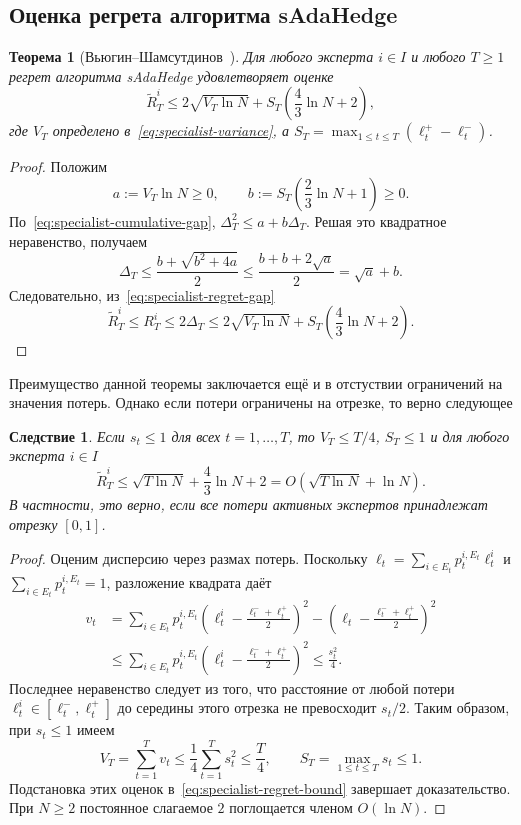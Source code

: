 \documentclass[a4paper,12pt]{article}
\theoremstyle{plain}
\newtheorem*{theorem}{Теорема}
\newtheorem*{corollary}{Следствие}
\theoremstyle{definition}
\theoremstyle{remark}
\numberwithin{equation}{section}
\begin{document}
\subsection{Оценка регрета алгоритма sAdaHedge}

\begin{theorem}[Вьюгин--Шамсутдинов~\cite{VyuginSham}]
Для любого эксперта $i\in I$ и любого $T\geqslant1$ регрет алгоритма sAdaHedge удовлетворяет оценке
\begin{equation}
\label{eq:specialist-regret-bound}
\widetilde R_T^i
\leqslant2\sqrt{V_T\ln N}
 +S_T\left(\frac43\ln N+2\right),
\end{equation}
где $V_T$ определено в~\eqref{eq:specialist-variance}, а $S_T=\max_{1\leqslant t\leqslant T}(\ell_t^+-\ell_t^-)$.
\end{theorem}

\begin{proof}
Положим
\[
a:=V_T\ln N\geqslant0,
\qquad
b:=S_T\left(\frac23\ln N+1\right)\geqslant0.
\]
По~\eqref{eq:specialist-cumulative-gap}, $\Delta_T^2\leqslant a+b\Delta_T$. Решая это квадратное неравенство, получаем
\[
\Delta_T
\leqslant\frac{b+\sqrt{b^2+4a}}2
\leqslant\frac{b+b+2\sqrt a}2
=\sqrt a+b.
\]
Следовательно, из~\eqref{eq:specialist-regret-gap}
\[
\widetilde R_T^i
\leqslant R_T^i
\leqslant2\Delta_T
\leqslant2\sqrt{V_T\ln N}
 +S_T\left(\frac43\ln N+2\right).
\]
\end{proof}

Преимущество данной теоремы заключается ещё и в отстуствии ограничений на значения потерь. Однако если потери ограничены на отрезке, то верно следующее

\begin{corollary}
Если $s_t\leqslant1$ для всех $t=1,\dots,T$, то $V_T\leqslant T/4$, $S_T\leqslant1$ и для любого эксперта $i\in I$
\[
\widetilde R_T^i
\leqslant\sqrt{T\ln N}+\frac43\ln N+2
=O\!\left(\sqrt{T\ln N}+\ln N\right).
\]
В частности, это верно, если все потери активных экспертов принадлежат отрезку $[0,1]$.
\end{corollary}

\begin{proof}
Оценим дисперсию через размах потерь. Поскольку $\ell_t=\sum_{i\in E_t}p_t^{i,E_t}\ell_t^i$ и $\sum_{i\in E_t}p_t^{i,E_t}=1$, разложение квадрата даёт
\[
\begin{aligned}
v_t
&=\sum_{i\in E_t}p_t^{i,E_t}
  \left(\ell_t^i-\frac{\ell_t^-+\ell_t^+}{2}\right)^2
  -\left(\ell_t-\frac{\ell_t^-+\ell_t^+}{2}\right)^2\\
&\leqslant\sum_{i\in E_t}p_t^{i,E_t}
  \left(\ell_t^i-\frac{\ell_t^-+\ell_t^+}{2}\right)^2
\leqslant\frac{s_t^2}{4}.
\end{aligned}
\]
Последнее неравенство следует из того, что расстояние от любой потери $\ell_t^i\in[\ell_t^-,\ell_t^+]$ до середины этого отрезка не превосходит $s_t/2$.
Таким образом, при $s_t\leqslant1$ имеем
\[
V_T=\sum_{t=1}^{T}v_t\leqslant\frac14\sum_{t=1}^{T}s_t^2\leqslant\frac T4,
\qquad S_T=\max_{1\leqslant t\leqslant T}s_t\leqslant1.
\]
Подстановка этих оценок в~\eqref{eq:specialist-regret-bound} завершает доказательство. При $N\geqslant2$ постоянное слагаемое $2$ поглощается членом $O(\ln N)$.
\end{proof}
\end{document}
